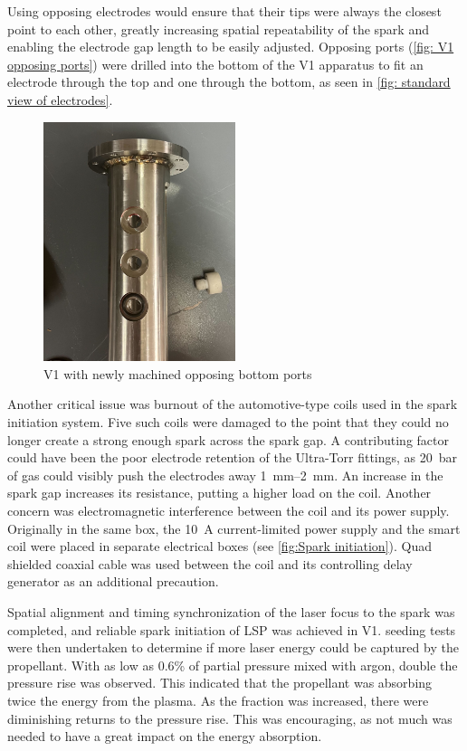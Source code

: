 Using opposing electrodes would ensure that their tips were always the closest point to each other, greatly increasing spatial repeatability of the spark and enabling the electrode gap length to be easily adjusted. Opposing ports (\autoref{fig: V1 opposing ports}) were drilled into the bottom of the V1 apparatus to fit an electrode through the top and one through the bottom, as seen in \autoref{fig: standard view of electrodes}.

\begin{figure}[!ht]
    \centering
    \includegraphics[width=0.5\textwidth]{assets/5 discussion/Bottom ports machined.jpg}
    \caption{V1 with newly machined opposing bottom ports}
    \label{fig: V1 opposing ports}
\end{figure}

Another critical issue was burnout of the automotive-type coils used in the spark initiation system. Five such coils were damaged to the point that they could no longer create a strong enough spark across the spark gap. A contributing factor could have been the poor electrode retention of the Ultra-Torr fittings, as \qty{20}{bar} of gas could visibly push the electrodes away \qtyrange{1}{2}{mm}. An increase in the spark gap increases its resistance, putting a higher load on the coil. Another concern was electromagnetic interference between the coil and its power supply. Originally in the same box, the \qty{10}{A} current-limited power supply and the smart coil were placed in separate electrical boxes (see \autoref{fig:Spark initiation}). Quad shielded coaxial cable was used between the coil and its controlling delay generator as an additional precaution. 

Spatial alignment and timing synchronization of the laser focus to the spark was completed, and reliable spark initiation of LSP was achieved in V1.  seeding tests were then undertaken to determine if more laser energy could be captured by the propellant. With as low as 0.6\% of  partial pressure mixed with argon, double the pressure rise was observed. This indicated that the propellant was absorbing twice the energy from the plasma. As the  fraction was increased, there were diminishing returns to the pressure rise. This was encouraging, as not much  was needed to have a great impact on the energy absorption.

